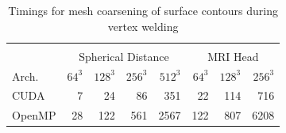 \documentclass[review,journal]{vgtc}         %
\begin{document}
\begin{table}[htb!]
\begin{center}
\caption{Timings for mesh coarsening of surface contours during vertex welding}
\label{tab:timingscoarsening}
\begin{tabular}{l|r r r r|r r r}
\multicolumn{8}{c}{ } \\
 & \multicolumn{4}{|c|}{Spherical Distance} & \multicolumn{3}{|c}{MRI Head}\\
Arch. & $64^3$ & $128^3$ & $256^3$ & $512^3$ & $64^3$ & $128^3$ & $256^3$\\
\hline
CUDA & 7 & 24 & 86 & 351 & 22 & 114 & 716 \\
OpenMP & 28 & 122 & 561 & 2567 & 122 & 807 & 6208 \\
\end{tabular}
\end{center}
\end{table}
\end{document}
